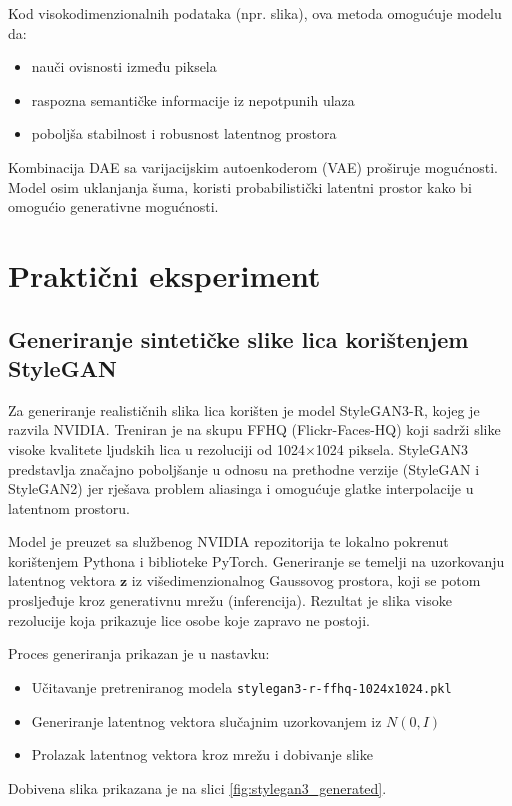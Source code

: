 \documentclass[times, utf8, seminar, numeric]{fer}
\begin{document}
		Kod visokodimenzionalnih podataka (npr. slika), ova metoda omogućuje modelu da:
		\begin{itemize}
			\item nauči ovisnosti između piksela
			\item raspozna semantičke informacije iz nepotpunih ulaza
			\item poboljša stabilnost i robusnost latentnog prostora
		\end{itemize}
		
		Kombinacija DAE sa varijacijskim autoenkoderom (VAE) proširuje mogućnosti. Model osim uklanjanja šuma, koristi probabilistički latentni prostor kako bi omogućio generativne mogućnosti.
		
	
	\chapter{Praktični eksperiment}
		\section{Generiranje sintetičke slike lica korištenjem StyleGAN}
		Za generiranje realističnih slika lica korišten je model StyleGAN3-R, kojeg je razvila NVIDIA. Treniran je na skupu FFHQ (Flickr-Faces-HQ) koji sadrži slike visoke kvalitete ljudskih lica u rezoluciji od 1024×1024 piksela. StyleGAN3 predstavlja značajno poboljšanje u odnosu na prethodne verzije (StyleGAN i StyleGAN2) jer rješava problem aliasinga i omogućuje glatke interpolacije u latentnom prostoru.
		
		Model je preuzet sa službenog NVIDIA repozitorija te lokalno pokrenut korištenjem Pythona i biblioteke PyTorch. Generiranje se temelji na uzorkovanju latentnog vektora $\bm{z}$ iz višedimenzionalnog Gaussovog prostora, koji se potom prosljeđuje kroz generativnu mrežu (inferencija). Rezultat je slika visoke rezolucije koja prikazuje lice osobe koje zapravo ne postoji.
		
		Proces generiranja prikazan je u nastavku:
		\begin{itemize}
			\item Učitavanje pretreniranog modela \texttt{stylegan3-r-ffhq-1024x1024.pkl}
			\item Generiranje latentnog vektora slučajnim uzorkovanjem iz $N(0, I)$
			\item Prolazak latentnog vektora kroz mrežu i dobivanje slike
		\end{itemize}
		
		Dobivena slika prikazana je na slici \ref{fig:stylegan3_generated}.
		
\end{document}
